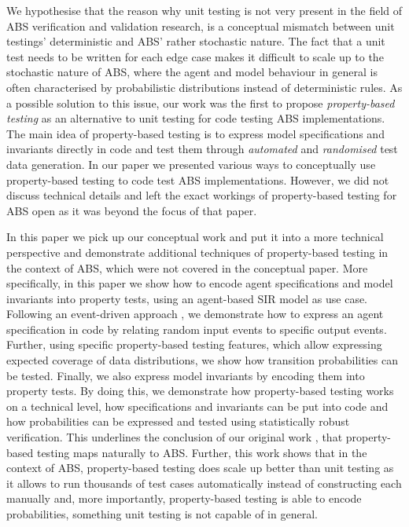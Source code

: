 We hypothesise that the reason why unit testing is not very present in the field of ABS verification and validation research, is a conceptual mismatch between unit testings' deterministic and ABS' rather stochastic nature. The fact that a unit test needs to be written for each edge case makes it difficult to scale up to the stochastic nature of ABS, where the agent and model behaviour in general is often characterised by probabilistic distributions instead of deterministic rules. As a possible solution to this issue, our work \cite{thaler_show_2019} was the first to propose \textit{property-based testing} as an alternative to unit testing for code testing ABS implementations. The main idea of property-based testing is to express model specifications and invariants directly in code and test them through \textit{automated} and \textit{randomised} test data generation. In our paper \cite{thaler_show_2019} we presented various ways to conceptually use property-based testing to code test ABS implementations. However, we did not discuss technical details and left the exact workings of property-based testing for ABS open as it was beyond the focus of that paper.

In this paper we pick up our conceptual work \cite{thaler_show_2019} and put it into a more technical perspective and demonstrate additional techniques of property-based testing in the context of ABS, which were not covered in the conceptual paper. More specifically, in this paper we show how to encode agent specifications and model invariants into property tests, using an agent-based SIR model \cite{macal_agent-based_2010} as use case. Following an event-driven approach \cite{meyer_event-driven_2014}, we demonstrate how to express an agent specification in code by relating random input events to specific output events. Further, using specific property-based testing features, which allow expressing expected coverage of data distributions, we show how transition probabilities can be tested. Finally, we also express model invariants by encoding them into property tests. By doing this, we demonstrate how property-based testing works on a technical level, how specifications and invariants can be put into code and how probabilities can be expressed and tested using statistically robust verification. This underlines the conclusion of our original work \cite{thaler_show_2019}, that property-based testing maps naturally to ABS. Further, this work shows that in the context of ABS, property-based testing does scale up better than unit testing as it allows to run thousands of test cases automatically instead of constructing each manually and, more importantly, property-based testing is able to encode probabilities, something unit testing is not capable of in general.


